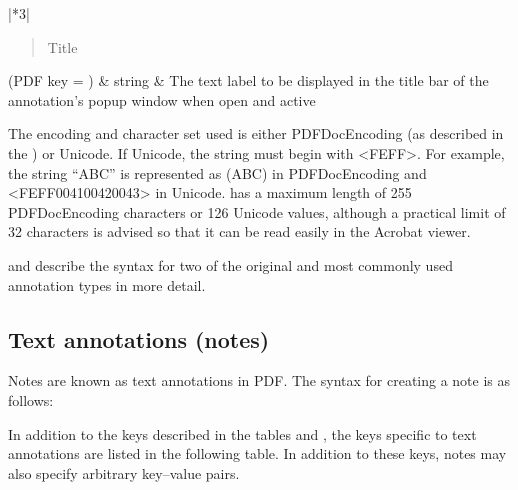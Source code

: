 \documentclass[letterpaper,12pt,english,openany,oneside]{sphinxmanual}
\begin{document}
\begin{savenotes}
\begin{tabular}[t]{|*{3}{|}}
\begin{quote}
Title
\end{quote}

(PDF key =  )
&
string
&
The text label to be displayed in the title bar of the annotation’s pop\sphinxhyphen{}up window when open and active

The encoding and character set used is either PDFDocEncoding (as described in the  ) or Unicode. If Unicode, the string must begin with <FEFF>. For example, the string “ABC” is represented as (ABC) in PDFDocEncoding and <FEFF004100420043> in Unicode.  has a maximum length of 255 PDFDocEncoding characters or 126 Unicode values, although a practical limit of 32 characters is advised so that it can be read easily in the Acrobat viewer.
\\
\hline
\end{tabular}
\par
\sphinxattableend\end{savenotes}

 and  describe the syntax for two of the original and most commonly used annotation types in more detail.


\subsection{Text annotations (notes)}
\label{\detokenize{pdfmark_Basic:text-annotations-notes}}
Notes are known as text annotations in PDF. The syntax for creating a note is as follows:

\begin{sphinxVerbatim}[commandchars=\\\{\}]
\PYG{p}{[}  
        \PYG{p}{[}   \PYG{p}{]}
        
        
        
        
        
        
        
        
\end{sphinxVerbatim}

In addition to the keys described in the tables  and , the keys specific to text annotations are listed in the following table. In addition to these keys, notes may also specify arbitrary key–value pairs.
\end{document}
